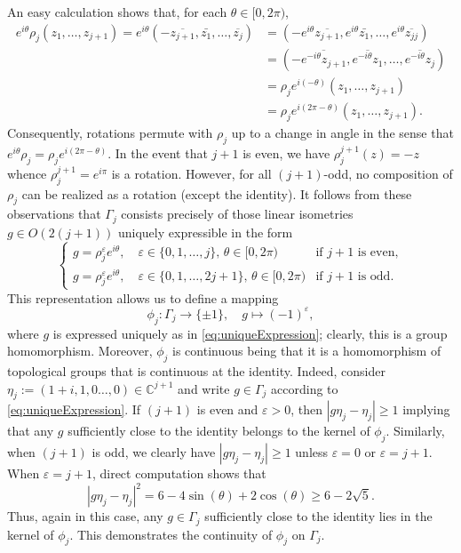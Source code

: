 \documentclass[10pt, reqno]{amsart}
\newcommand{\abs}[1]{\left\vert #1 \right\vert}
\newcommand{\CC}{\mathbb{C}}
\renewcommand{\epsilon}{\varepsilon}
\numberwithin{equation}{section}
\theoremstyle{definition}
\theoremstyle{remark}
\theoremstyle{plain}
\begin{document}
	An easy calculation shows that, for each $\theta \in [0,2\pi)$,
	\begin{align*}
		e^{i\theta} \rho_j(z_1,\dots,z_{j+1}) = e^{i{\theta}} (-\overline{z_{j+1}}, \bar{z_1},\dots, \overline{z_{j}}) &= (-e^{i\theta}\overline{z_{j+1}},e^{i\theta} \bar{z_1},\dots, e^{i\theta}\overline{z_{jj}}) \\
		&= (-\overline{e^{-i\theta} z_{j+1}}, \overline{e^{-i\theta} z_1},\dots, \overline{e^{-i\theta} z_{j}})\\
		&= \rho_j e^{i(-\theta)}(z_1,\dots,z_{j+1})\\
		&= \rho_j e^{i(2\pi - \theta)}(z_1,\dots,z_{j+1}).
	\end{align*}
	Consequently, rotations permute with $\rho_j$ up to a change in angle in the sense that $e^{i\theta} \rho_j = \rho_j e^{i(2\pi - \theta)}$. In the event that $j+1$ is even, we have $\rho_j^{j+1}(z) = -z$ whence $\rho_j^{j+1} = e^{i\pi}$ is a rotation. However, for all $(j+1)$-odd, no composition of $\rho_j$ can be realized as a rotation (except the identity). It follows from these observations that $\Gamma_j$ consists precisely of those linear isometries $g \in O(2(j+1))$ uniquely expressible in the form
	\begin{equation}\label{eq:uniqueExpression}
		\begin{cases}
			g = \rho_j^{\epsilon} e^{i\theta}, \quad \epsilon \in \{0,1, \dots, j\}, \, \theta \in [0,2\pi) & \text{if $j+1$ is even},\\
			g = \rho_j^{\epsilon} e^{i\theta}, \quad \epsilon \in \{0,1,\dots, 2j+1\},\, \theta \in [0,2\pi) & \text{if $j +1$ is odd}.
		\end{cases}
	\end{equation}
	This representation allows us to define a mapping
	\[
	\phi_j : \Gamma_j \to \{\pm 1\}, \quad g \mapsto (-1)^\epsilon,
	\]
	where $g$ is expressed uniquely as in \eqref{eq:uniqueExpression}; clearly, this is a group homomorphism. Moreover, $\phi_j$ is continuous being that it is a homomorphism of topological groups that is continuous at the identity. Indeed, consider $\eta_j := (1+i, 1, 0\dots, 0) \in \CC^{j+1}$ and write $g \in \Gamma_j$ according to \eqref{eq:uniqueExpression}. If $(j+1)$ is even and $\epsilon>0$, then $\abs{g\eta_j - \eta_j} \ge 1$ implying that any $g$ sufficiently close to the identity belongs to the kernel of $\phi_j$. Similarly, when $(j+1)$ is odd, we clearly have $\abs{g\eta_j - \eta_j} \ge 1$ unless $\epsilon = 0$ or $\epsilon = j+1$. When $\epsilon = j+1$, direct computation shows that \[\abs{g\eta_j - \eta_j}^2 = 6-4\sin(\theta)+2\cos(\theta) \ge 6 - 2\sqrt{5}.\] Thus, again in this case, any $g \in \Gamma_j$ sufficiently close to the identity lies in the kernel of $\phi_j$. This demonstrates the continuity of $\phi_j$ on $\Gamma_j$.
	
\end{document}
